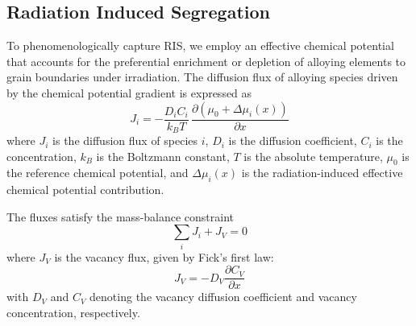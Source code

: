 \documentclass[12pt]{article}
\begin{document}
\subsection{Radiation Induced Segregation} \label{sec:ris}

To phenomenologically capture RIS, we employ an effective chemical potential that accounts for the preferential enrichment or depletion of alloying elements to grain boundaries under irradiation. The diffusion flux of alloying species driven by the chemical potential gradient is expressed as
\begin{equation}\label{equ:fickwithmiu}
J_i = -\frac{D_i C_i}{k_B T}\,\frac{\partial \left(\mu_0 + \Delta \mu_i(x)\right)}{\partial x}
\end{equation}
where \(J_i\) is the diffusion flux of species \(i\), \(D_i\) is the diffusion coefficient, \(C_i\) is the concentration, \(k_B\) is the Boltzmann constant, \(T\) is the absolute temperature, \(\mu_0\) is the reference chemical potential, and \(\Delta \mu_i(x)\) is the radiation-induced effective chemical potential contribution.

The fluxes satisfy the mass-balance constraint
\begin{equation}\label{equ:massbalance}
\sum_i J_i + J_V = 0
\end{equation}
where \(J_V\) is the vacancy flux, given by Fick's first law:
\begin{equation}\label{equ:vacfick}
J_V = -D_V \frac{\partial C_V}{\partial x}
\end{equation}
with \(D_V\) and \(C_V\) denoting the vacancy diffusion coefficient and vacancy concentration, respectively.
\end{document}
